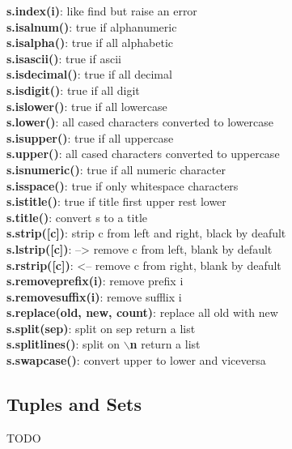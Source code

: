 \documentclass{cheatsheet}
\begin{document}
    \textbf{s.index(i)}: like find but raise an error \\
    \textbf{s.isalnum()}: true if alphanumeric \\
    \textbf{s.isalpha()}: true if all alphabetic \\
    \textbf{s.isascii()}: true if ascii \\
    \textbf{s.isdecimal()}: true if all decimal \\
    \textbf{s.isdigit()}: true if all digit \\
    \textbf{s.islower()}: true if all lowercase \\
    \textbf{s.lower()}: all cased characters converted to lowercase \\
    \textbf{s.isupper()}: true if all uppercase \\
    \textbf{s.upper()}: all cased characters converted to uppercase \\
    \textbf{s.isnumeric()}: true if all numeric character \\
    \textbf{s.isspace()}: true if only whitespace characters \\
    \textbf{s.istitle()}: true if title first upper rest lower \\
    \textbf{s.title()}: convert s to a title \\
    \textbf{s.strip([c])}: strip c from left and right, black by deafult \\
    \textbf{s.lstrip([c])}: --> remove c from left, blank by default \\
    \textbf{s.rstrip([c])}: <-- remove c from right, blank by deafult \\
    \textbf{s.removeprefix(i)}: remove prefix i\\
    \textbf{s.removesuffix(i)}: remove sufflix i \\
    \textbf{s.replace(old, new, count)}: replace all old with new \\
    \textbf{s.split(sep)}: split on sep return a list \\
    \textbf{s.splitlines()}: split on \textbf{$\backslash$n} return a list \\
    \textbf{s.swapcase()}: convert upper to lower and viceversa

    \subsection{Tuples and Sets}
    TODO
\end{document}
